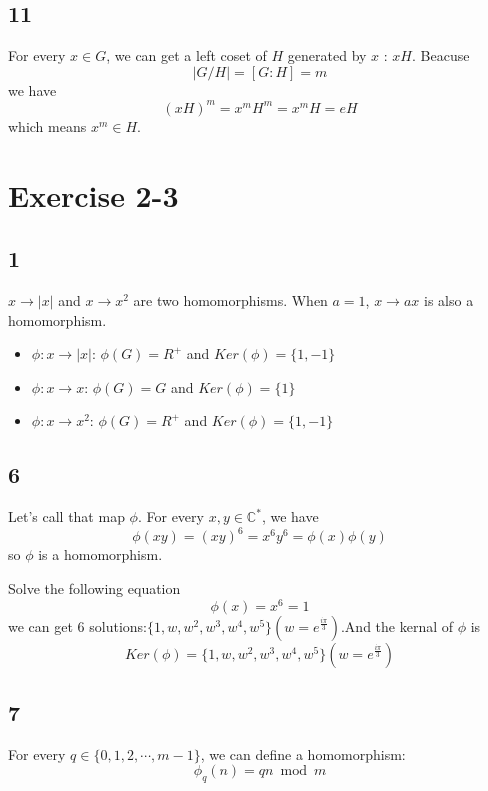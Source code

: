\documentclass[draft]{article}
\begin{document}
		\subsection*{11}
			For every $x \in G$, we can get a left coset of $H$ generated by $x$ : $xH$.
			Beacuse 
			$$
			\vert G / H \vert = [G : H] = m
			$$
			we have
			$$
			(xH)^m = x^mH^m = x^mH = eH
			$$
			which means $x^m \in H$.
	\section*{Exercise 2-3}
		\subsection*{1}
			$x \rightarrow \vert x \vert$ and $x \rightarrow x^2$ are two
			homomorphisms. When $a = 1$, $x \rightarrow ax$ is also a homomorphism.
			\begin{itemize}
				\item $\phi:x \rightarrow \vert x \vert$:
					$\phi(G) = R^{+}$ and $Ker(\phi) = \{1, -1\}$
				\item $\phi:x \rightarrow x$:
					$\phi(G) = G$ and $Ker(\phi) = \{1\}$
				\item $\phi:x \rightarrow x^2$:
					$\phi(G) = R^{+}$ and $Ker(\phi) = \{1, -1\}$
			\end{itemize}
		\subsection*{6}
			Let's call that map $\phi$. For every $x,y \in \mathbb{C}^{*}$, we have
			$$
				\phi(xy) = (xy)^6 = x^6y^6 = \phi(x)\phi(y)
			$$
			so $\phi$ is a homomorphism.
			
			Solve the following equation
			$$
				\phi(x) = x^6 = 1
			$$
			we can get $6$ solutions:$\{ 1, w, w^2, w^3, w^4, w^5\} (w =
			e^{\frac{i\pi}{3}})$.And the kernal of $\phi$ is
			$$
			Ker(\phi) = \{ 1, w, w^2, w^3, w^4, w^5\} (w = e^{\frac{i\pi}{3}})
			$$
		\subsection*{7}
			For every $q \in \{0, 1, 2, \cdots, m - 1\}$,  we can define a homomorphism:
			$$
				\phi_q(n) = qn \bmod m
			$$
\end{document}
